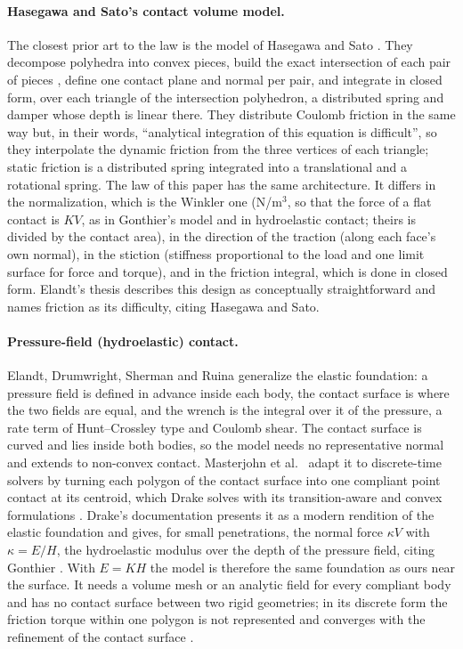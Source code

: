 \paragraph{Hasegawa and Sato's contact volume model.} The closest prior art to the
 law is the model of Hasegawa and Sato \cite{Hasegawa2004}. They decompose
polyhedra into convex pieces, build the exact intersection of each pair of pieces
\cite{Muller1978}, define one contact plane and normal per pair, and integrate in closed form,
over each triangle of the intersection polyhedron, a distributed spring and damper whose depth
is linear there. They distribute Coulomb friction in the same way but, in their words,
``analytical integration of this equation is difficult'', so they interpolate the dynamic
friction from the three vertices of each triangle; static friction is a distributed spring
integrated into a translational and a rotational spring. The  law of this
paper has the same architecture. It differs in the normalization, which is the Winkler one
(N/m$^3$, so that the force of a flat contact is $K V$, as in Gonthier's model and in
hydroelastic contact; theirs is divided by the contact area), in the direction of the traction
(along each face's own normal), in the stiction (stiffness proportional to the load and one
limit surface for force and torque), and in the friction integral, which is done in closed
form. Elandt's thesis \cite{ElandtThesis2022} describes this design as conceptually
straightforward and names friction as its difficulty, citing Hasegawa and Sato.

\paragraph{Pressure-field (hydroelastic) contact.} Elandt, Drumwright, Sherman and Ruina
\cite{Elandt2019} generalize the elastic foundation: a pressure field is defined in advance
inside each body, the contact surface is where the two fields are equal, and the wrench is the
integral over it of the pressure, a rate term of Hunt--Crossley type and Coulomb shear. The
contact surface is curved and lies inside both bodies, so the model needs no representative
normal and extends to non-convex contact. Masterjohn et al.~\cite{Masterjohn2022} adapt it to
discrete-time solvers by turning each polygon of the contact surface into one compliant point
contact at its centroid, which Drake solves with its transition-aware and convex formulations
\cite{Castro2020,Castro2023,Castro2025}. Drake's documentation presents it as a modern
rendition of the elastic foundation and gives, for small penetrations, the normal force
$\kappa V$ with $\kappa = E/H$, the hydroelastic modulus over the depth of the pressure field,
citing Gonthier \cite{DrakeHydroParams}. With $E = K H$ the model is therefore the same
foundation as ours near the surface. It needs a volume mesh or an analytic field for every
compliant body and has no contact surface between two rigid geometries; in its discrete form
the friction torque within one polygon is not represented and converges with the refinement of
the contact surface \cite{DrakeHydroGuide}.

